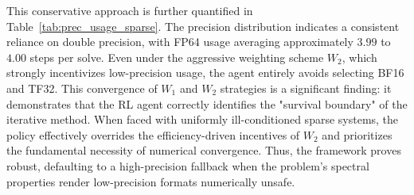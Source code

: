 \documentclass[Afour,sageh,times]{sagej}
\theoremstyle{plain}
\theoremstyle{definition}
\begin{document}
This conservative approach is further quantified in Table~\ref{tab:prec_usage_sparse}. The precision distribution indicates a consistent reliance on double precision, with FP64 usage averaging approximately $3.99$ to $4.00$ steps per solve. Even under the aggressive weighting scheme $W_2$, which strongly incentivizes low-precision usage, the agent entirely avoids selecting BF16 and TF32.
This convergence of $W_1$ and $W_2$ strategies is a significant finding: it demonstrates that the RL agent correctly identifies the "survival boundary" of the iterative method. When faced with uniformly ill-conditioned sparse systems, the policy effectively overrides the efficiency-driven incentives of $W_2$ and prioritizes the fundamental necessity of numerical convergence. Thus, the framework proves robust, defaulting to a high-precision fallback when the problem's spectral properties render low-precision formats numerically unsafe.
\end{document}
